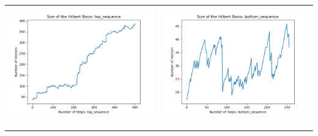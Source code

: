 \documentclass[10pt]{article}
\begin{document}
\begin{tabular}{c|c}
\begin{minipage}{.4\textwidth}
\includegraphics[width=\textwidth]{"DATA/4d/5 generators 2 bound J/top_sequence SIZE"}
\end{minipage} &
\begin{minipage}{.4\textwidth}
\includegraphics[width=\textwidth]{"DATA/4d/5 generators 2 bound J bottomup/bottom_sequence SIZE"}
\end{minipage} \\ \\
\hline \\\begin{minipage}{.4\textwidth}

\end{minipage}
\end{tabular}
\end{document}
